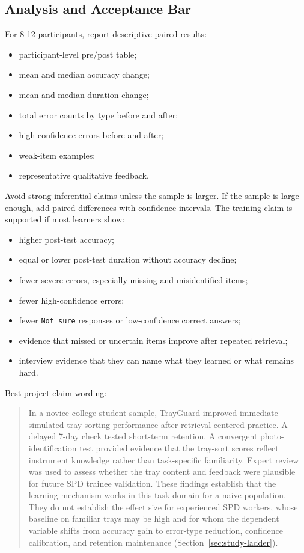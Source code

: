 \documentclass[10pt,a4paper]{article}
\begin{document}
\subsection{Analysis and Acceptance Bar}

For 8-12 participants, report descriptive paired results:
\begin{itemize}
  \item participant-level pre/post table;
  \item mean and median accuracy change;
  \item mean and median duration change;
  \item total error counts by type before and after;
  \item high-confidence errors before and after;
  \item weak-item examples;
  \item representative qualitative feedback.
\end{itemize}
Avoid strong inferential claims unless the sample is larger. If the sample is
large enough, add paired differences with confidence intervals.
The training claim is supported if most learners show:
\begin{itemize}
  \item higher post-test accuracy;
  \item equal or lower post-test duration without accuracy decline;
  \item fewer severe errors, especially missing and misidentified items;
  \item fewer high-confidence errors;
  \item fewer \texttt{Not sure} responses or low-confidence correct answers;
  \item evidence that missed or uncertain items improve after repeated retrieval;
  \item interview evidence that they can name what they learned or what remains hard.
\end{itemize}
Best project claim wording:
\begin{quote}
In a novice college-student sample, TrayGuard improved immediate simulated
tray-sorting performance after retrieval-centered practice. A delayed
7-day check tested short-term retention. A convergent photo-identification test
provided evidence that the tray-sort scores reflect instrument knowledge rather
than task-specific familiarity. Expert review was used to assess whether the
tray content and feedback were plausible for future SPD trainee validation.
These findings establish that the learning mechanism works in this task domain
for a naive population. They do not establish the effect size for experienced
SPD workers, whose baseline on familiar trays may be high and for whom the
dependent variable shifts from accuracy gain to error-type reduction,
confidence calibration, and retention maintenance (Section~\ref{sec:study-ladder}).
\end{quote}
\end{document}
